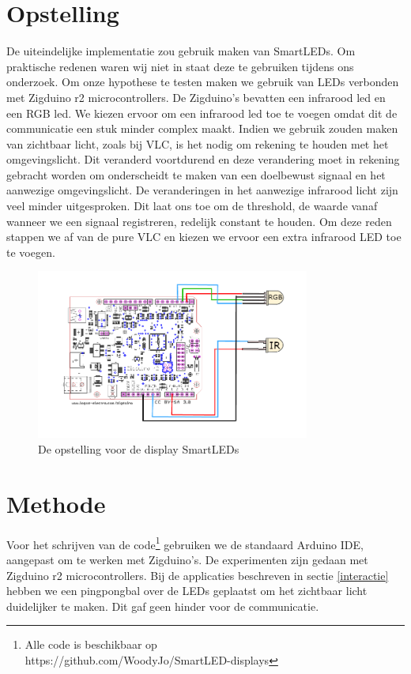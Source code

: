 \documentclass{article}
\begin{document}
\section{Opstelling}
De uiteindelijke implementatie zou gebruik maken van SmartLEDs. Om praktische redenen waren wij niet in staat deze te gebruiken tijdens ons onderzoek. 
Om onze hypothese te testen maken we gebruik van LEDs verbonden met Zigduino r2 microcontrollers. De Zigduino’s bevatten een infrarood led en een RGB led. We kiezen ervoor om een infrarood led toe te voegen omdat dit de communicatie een stuk minder complex maakt. Indien we gebruik zouden maken van zichtbaar licht, zoals bij VLC, is het nodig om rekening te houden met het omgevingslicht. Dit veranderd voortdurend en deze verandering moet in rekening gebracht worden om onderscheidt te maken van een doelbewust signaal en het aanwezige omgevingslicht. De veranderingen in het aanwezige infrarood licht zijn veel minder uitgesproken. Dit laat ons toe om de threshold, de waarde vanaf wanneer we een signaal registreren, redelijk constant te houden. Om deze reden stappen we af van de pure VLC en kiezen we ervoor een extra infrarood LED toe te voegen.

\begin{figure}[H]
\centering
\includegraphics[width=9cm]{Opstelling.png}
\caption{De opstelling voor de display SmartLEDs}
\label{fig:opstelling}
\end{figure}


\section{Methode}

Voor het schrijven van de code\footnote{Alle code is beschikbaar op \\ https://github.com/WoodyJo/SmartLED-displays} gebruiken we de standaard Arduino IDE, aangepast om te werken met Zigduino's. De experimenten zijn gedaan met Zigduino r2 microcontrollers. Bij de applicaties beschreven in sectie \ref{interactie} hebben we een pingpongbal over de LEDs geplaatst om het zichtbaar licht duidelijker te maken. Dit gaf geen hinder voor de communicatie.
\end{document}
